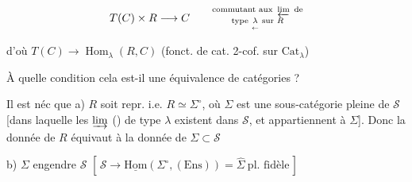 \[T(C)\times R\longrightarrow C\qquad\substack{\text{commutant aux }\varprojlim\text{ de}\\\text{type }\underset{\leftarrow}{\lambda}\text{ sur }R}\]

d'où $T(C)\to\operatorname{Hom}_{\lambda}(R,C)$ (fonct. de cat. 2-cof. sur $\mathrm{Cat}_\lambda$)

À quelle condition cela est-il une équivalence de catégories ?

Il est néc que a) $R$ soit  repr. i.e. $R\simeq\Sigma^\circ$, où $\Sigma$ est une sous-catégorie pleine de $\mathscr S$ [dans laquelle les $\varinjlim$ () de type $\lambda$ existent dans $\mathscr S$, et appartiennent à $\Sigma$]. Donc la donnée de $R$ équivaut à la donnée de $\Sigma\subset\mathscr S$

b) $\Sigma$ engendre $\mathscr S$ $[\,\mathscr S\to\underline{\mathrm{Hom}}(\Sigma^\circ,(\mathrm{Ens}))=\widehat\Sigma\ \text{pl. fidèle}\,]$
